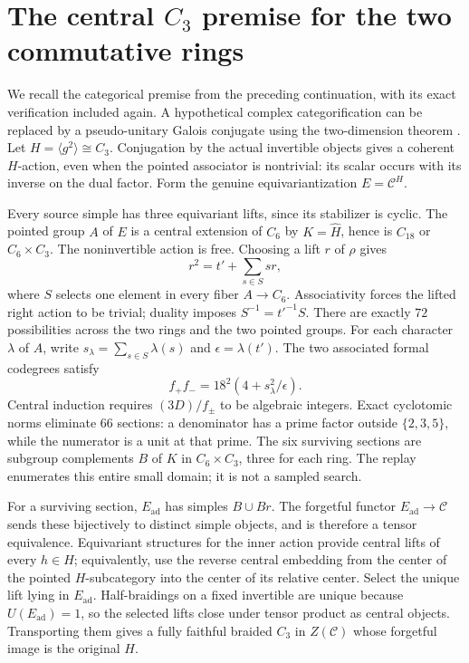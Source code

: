 \documentclass[11pt]{article}
\begin{document}
\section{The central \texorpdfstring{$C_3$}{C3} premise for the two commutative rings}
We recall the categorical premise from the preceding continuation,
with its exact verification included again. A hypothetical complex
categorification can be replaced by a pseudo-unitary Galois conjugate
using the two-dimension theorem \cite[Lemma 3.1]{Sch23}.
Let $H=\langle g^2\rangle\cong C_3$. Conjugation by the actual invertible
objects gives a coherent $H$-action, even when the pointed associator
is nontrivial: its scalar occurs with its inverse on the dual factor.
Form the genuine equivariantization $E=\mathcal C^H$.

Every source simple has three equivariant lifts, since its stabilizer is
cyclic. The pointed group $A$ of $E$ is a central extension of $C_6$ by
$K=\widehat H$, hence is $C_{18}$ or $C_6\times C_3$. The noninvertible
action is free. Choosing a lift $r$ of $\rho$ gives
\[
 r^2=t'+\sum_{s\in S}sr,
\]
where $S$ selects one element in every fiber $A\to C_6$. Associativity
forces the lifted right action to be trivial; duality imposes
$S^{-1}=t'^{-1}S$. There are exactly $72$ possibilities across the two
rings and the two pointed groups. For each character $\lambda$ of $A$,
write $s_\lambda=\sum_{s\in S}\lambda(s)$ and
$\epsilon=\lambda(t')$. The two associated formal codegrees satisfy
\[
 f_+f_-=18^2(4+s_\lambda^2/\epsilon).
\]
Central induction requires $(3D)/f_\pm$ to be algebraic integers.
Exact cyclotomic norms eliminate $66$ sections: a denominator has a prime
factor outside $\{2,3,5\}$, while the numerator is a unit at that prime.
The six surviving sections are subgroup complements $B$ of $K$ in
$C_6\times C_3$, three for each ring. The replay enumerates this entire
small domain; it is not a sampled search.

For a surviving section, $E_{\mathrm{ad}}$ has simples $B\cup Br$.
The forgetful functor $E_{\mathrm{ad}}\to\mathcal C$ sends these
bijectively to distinct simple objects, and is therefore a tensor
equivalence. Equivariant structures for the inner action provide central
lifts of every $h\in H$; equivalently, use the reverse central embedding
from the center of the pointed $H$-subcategory into the center of its
relative center. Select the unique lift lying in $E_{\mathrm{ad}}$.
Half-braidings on a fixed invertible are unique because
$U(E_{\mathrm{ad}})=1$, so the selected lifts close under tensor product
as central objects. Transporting them gives a fully faithful braided
$C_3$ in $Z(\mathcal C)$ whose forgetful image is the original $H$.
\end{document}
